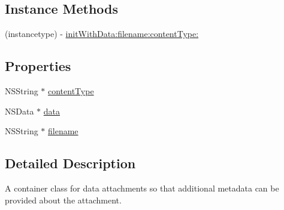 \subsection*{Instance Methods}
\begin{DoxyCompactItemize}
\item 
(instancetype) -\/ \hyperlink{interface_f_b_s_d_k_graph_request_data_attachment_a6a1772508de20c0d0546d4e079139b6b}{init\-With\-Data\-:filename\-:content\-Type\-:}
\end{DoxyCompactItemize}
\subsection*{Properties}
\begin{DoxyCompactItemize}
\item 
N\-S\-String $\ast$ \hyperlink{interface_f_b_s_d_k_graph_request_data_attachment_a721d770bcb1b89e4e23d084320636651}{content\-Type}
\item 
N\-S\-Data $\ast$ \hyperlink{interface_f_b_s_d_k_graph_request_data_attachment_add74d6b28d7630f13c711afbfed387c6}{data}
\item 
N\-S\-String $\ast$ \hyperlink{interface_f_b_s_d_k_graph_request_data_attachment_a65650c18882e736fc9ddc322008a4a88}{filename}
\end{DoxyCompactItemize}


\subsection{Detailed Description}
A container class for data attachments so that additional metadata can be provided about the attachment. 

